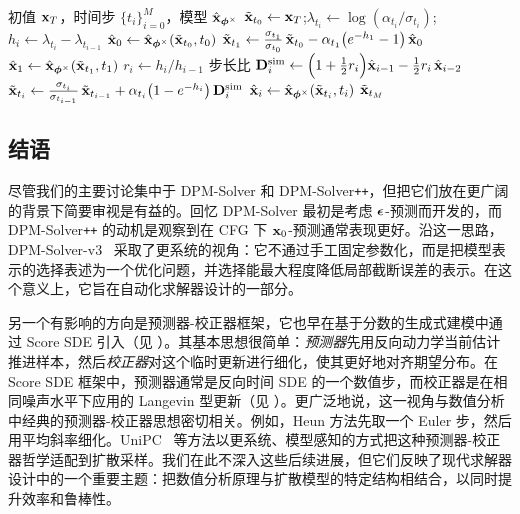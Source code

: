 \begin{algorithm}[H]
    \centering
    \caption{DPM-Solver\texttt{++}(2M)。}
    \label{alg:dpmpp-2m}
    \begin{algorithmic}[1]
    \Require 初值 ${\mathbf{x}}_T$，时间步 $\{t_i\}_{i=0}^M$，模型 $\hat{{\mathbf{x}}}_{{\bm{\phi}}^\times}$
    \State $\tilde{{\mathbf{x}}}_{t_0}\gets{\mathbf{x}}_T$;\quad $\lambda_{t_i}\gets \log(\alpha_{t_i}/\sigma_{t_i})$;\quad $h_i\gets \lambda_{t_i}-\lambda_{t_{i-1}}$
    \State $\hat{{\mathbf{x}}}_0 \gets \hat{{\mathbf{x}}}_{{\bm{\phi}}^\times}(\tilde{{\mathbf{x}}}_{t_0},t_0)$ 
    \Statex \noindent {}
    \State $\tilde{{\mathbf{x}}}_{t_1} \gets \tfrac{\sigma_{t_1}}{\sigma_{t_0}}\,\tilde{{\mathbf{x}}}_{t_0}
             - \alpha_{t_1}\big(e^{-h_1}-1\big)\,\hat{{\mathbf{x}}}_0$
    \State $\hat{{\mathbf{x}}}_1 \gets \hat{{\mathbf{x}}}_{{\bm{\phi}}^\times}(\tilde{{\mathbf{x}}}_{t_1},t_1)$ 
    \Statex {}
        \State $r_i \gets h_i/h_{i-1}$ \Comment 步长比
        \State ${\mathbf{D}}_i^{\mathrm{sim}} \gets \Big(1+\tfrac12 r_i\Big)\hat{{\mathbf{x}}}_{i-1} - \tfrac12 r_i\,\hat{{\mathbf{x}}}_{i-2}$
        \State $\tilde{{\mathbf{x}}}_{t_i} \gets \tfrac{\sigma_{t_i}}{\sigma_{t_{i-1}}}\,\tilde{{\mathbf{x}}}_{t_{i-1}}
               + \alpha_{t_i}\big(1-e^{-h_i}\big)\,{\mathbf{D}}_i^{\mathrm{sim}}$
        \State $\hat{{\mathbf{x}}}_i \gets \hat{{\mathbf{x}}}_{{\bm{\phi}}^\times}(\tilde{{\mathbf{x}}}_{t_i},t_i)$ 
    \EndFor
    \State \Return $\tilde{{\mathbf{x}}}_{t_M}$
    \end{algorithmic}
\end{algorithm}

\subsection{结语}
尽管我们的主要讨论集中于 DPM-Solver 和 DPM-Solver\texttt{++}，但把它们放在更广阔的背景下简要审视是有益的。回忆 DPM-Solver 最初是考虑 ${\bm{\epsilon}}$-预测而开发的，而 DPM-Solver\texttt{++} 的动机是观察到在 CFG 下 ${\mathbf{x}}_0$-预测通常表现更好。沿这一思路，DPM-Solver-v3~\citep{zheng2023dpm} 采取了更系统的视角：它不通过手工固定参数化，而是把模型表示的选择表述为一个优化问题，并选择能最大程度降低局部截断误差的表示。在这个意义上，它旨在自动化求解器设计的一部分。

另一个有影响的方向是预测器-校正器框架，它也早在基于分数的生成式建模中通过 Score SDE 引入（见 ）。其基本思想很简单：\emph{预测器}先用反向动力学当前估计推进样本，然后\emph{校正器}对这个临时更新进行细化，使其更好地对齐期望分布。在 Score SDE 框架中，预测器通常是反向时间 SDE 的一个数值步，而校正器是在相同噪声水平下应用的 Langevin 型更新（见 ）。更广泛地说，这一视角与数值分析中经典的预测器-校正器思想密切相关。例如，Heun 方法先取一个 Euler 步，然后用平均斜率细化。UniPC~\citep{zhao2023unipc} 等方法以更系统、模型感知的方式把这种预测器-校正器哲学适配到扩散采样。我们在此不深入这些后续进展，但它们反映了现代求解器设计中的一个重要主题：把数值分析原理与扩散模型的特定结构相结合，以同时提升效率和鲁棒性。


